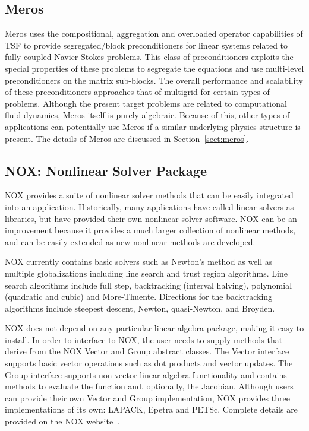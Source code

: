 \documentclass[acmtoms,acmnow]{acmtrans2m}
\begin{document}
\subsection{Meros}

Meros uses the compositional, aggregation and overloaded operator capabilities of
TSF to provide segregated/block preconditioners for linear systems
related to fully-coupled Navier-Stokes problems.  This class of
preconditioners exploits the special properties of these problems to
segregate the equations and use multi-level preconditioners on the
matrix sub-blocks.  The overall performance and scalability of these
preconditioners approaches that of multigrid for certain types of
problems.  Although the present target problems are related to
computational fluid dynamics, Meros itself is purely algebraic.
Because of this, other types of applications can potentially use Meros
if a similar underlying physics structure is present.  The details of
Meros are discussed in Section~\ref{sect:meros}.


\subsection{NOX: Nonlinear Solver Package}

NOX provides a suite of nonlinear solver methods that can be easily
integrated into an application.  Historically, many applications have
called linear solvers as libraries, but have provided their own
nonlinear solver software.  NOX can be an improvement because it
provides a much larger collection of nonlinear methods, and can be
easily extended as new nonlinear methods are developed.

NOX currently contains basic solvers such as Newton's method as well
as multiple globalizations including line search and trust
region algorithms. Line search algorithms include full step,
backtracking (interval halving), polynomial (quadratic and cubic) and
More-Thuente.  Directions for the backtracking algorithms include
steepest descent, Newton, quasi-Newton, and Broyden.

NOX does not depend on any particular linear algebra package, making
it easy to install. In order to interface to NOX, the user needs to
supply methods that derive from the NOX Vector and Group abstract
classes.  The Vector interface supports basic vector operations such
as dot products and vector updates. The Group interface supports
non-vector linear algebra functionality and contains methods to
evaluate the function and, optionally, the Jacobian.  
Although users can provide their own Vector and Group implementation,
NOX provides three implementations of its own: LAPACK, Epetra and
PETSc.  Complete details
are provided on the NOX website~\cite{NOX-home-page}.
\end{document}
